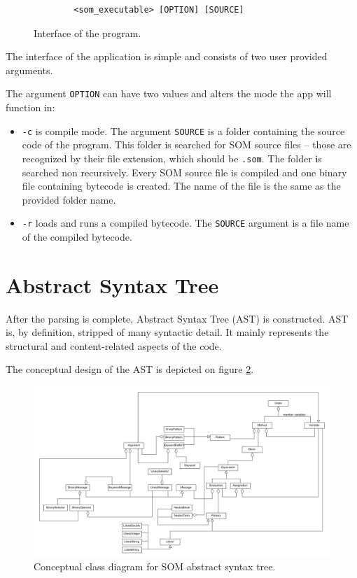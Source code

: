 \documentclass[thesis=M,english]{FITthesis}[2019/12/23]
\begin{document}
\begin{figure}[h!]
	\centering
	\begin{verbatim}
		<som_executable> [OPTION] [SOURCE]
	\end{verbatim}
	\caption{Interface of the program.}
	\label{fig:prog_interface}
\end{figure}

The interface of the application is simple and consists of two user provided arguments.

The argument \texttt{OPTION} can have two values and alters the mode the app will function in:
\begin{itemize}
	\item \texttt{-c} is compile mode. The argument \texttt{SOURCE} is a folder containing the source code of the program.
		This folder is searched for SOM source files -- those are recognized by their file extension, which should be \texttt{.som}.
		The folder is searched non recursively. Every SOM source file is compiled and one binary file containing bytecode is created.
		The name of the file is the same as the provided folder name.
	\item \texttt{-r} loads and runs a compiled bytecode. The \texttt{SOURCE} argument is a file name of the compiled bytecode.
\end{itemize}

\section{Abstract Syntax Tree}
After the parsing is complete, Abstract Syntax Tree (AST) is constructed. AST is, by definition, stripped of many syntactic detail.
It mainly represents the structural and content-related aspects of the code.

The conceptual design of the AST is depicted on figure \ref{fig:ast_class_concept}.

\begin{figure}
	\centering
	\includegraphics[width=\textwidth]{media/ast/ast_concept.png}
	\caption{Conceptual class diagram for SOM abstract syntax tree.}
	\label{fig:ast_class_concept}
\end{figure}
\end{document}
